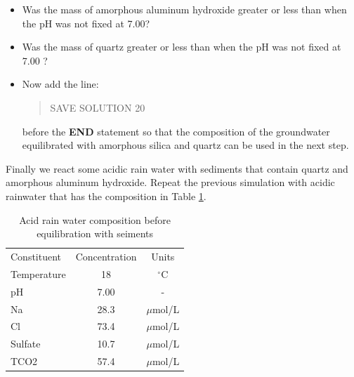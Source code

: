 \begin{itemize}

\item Was the mass of amorphous aluminum hydroxide greater or less than when the pH was not fixed at 7.00? 

\item Was the mass of quartz greater or less than when the pH was not fixed at 7.00 ?

\item Now add the line:

\begin{quote}
{\color{red}SAVE SOLUTION 20 } \\
\end{quote}

before the {\color{red}\textbf{END}} statement so that the composition of the 
groundwater equilibrated with amorphous silica and quartz can be used in the next step.
\end{itemize}

Finally we react some acidic rain water with sediments that contain quartz and amorphous aluminum hydroxide.
Repeat the previous simulation with acidic rainwater that has the composition in Table \ref{phc_ex_acid_rain_2}.

\begin{table}
\caption{Acid rain water composition before equilibration with seiments}
\begin{center}
\begin{tabular}{l c c }
\hline
Constituent	& Concentration	& Units     \\
Temperature	& 18	          & $^\circ$C \\
pH	        & 7.00          & 	-       \\
Na	        & 28.3	        &   $\mu$mol/L  \\
Cl	        & 73.4	        &   $\mu$mol/L  \\
Sulfate	    & 10.7	        &   $\mu$mol/L  \\
TCO2	      & 57.4          &   $\mu$mol/L  \\ \hline
\end{tabular}
\label{phc_ex_acid_rain_2}
\end{center}
\end{table}



